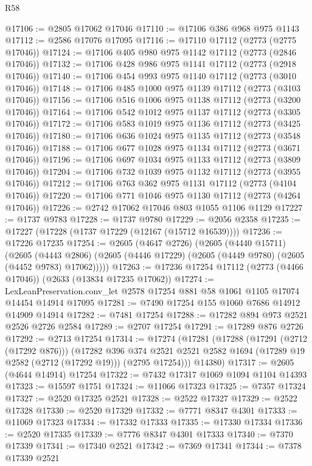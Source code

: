 \begin{lexlean}{R58}
\begin{coremodule}
@17106 := @2805 @17062 @17046
@17110 := @17106 @386 @968 @975 @1143
@17112 := @2586 @17076 @17095
@17116 := @17110 @17112 (@2773 (@2775 @17046))
@17124 := @17106 @405 @980 @975 @1142 @17112 (@2773 (@2846 @17046))
@17132 := @17106 @428 @986 @975 @1141 @17112 (@2773 (@2918 @17046))
@17140 := @17106 @454 @993 @975 @1140 @17112 (@2773 (@3010 @17046))
@17148 := @17106 @485 @1000 @975 @1139 @17112 (@2773 (@3103 @17046))
@17156 := @17106 @516 @1006 @975 @1138 @17112 (@2773 (@3200 @17046))
@17164 := @17106 @542 @1012 @975 @1137 @17112 (@2773 (@3305 @17046))
@17172 := @17106 @583 @1019 @975 @1136 @17112 (@2773 (@3425 @17046))
@17180 := @17106 @636 @1024 @975 @1135 @17112 (@2773 (@3548 @17046))
@17188 := @17106 @677 @1028 @975 @1134 @17112 (@2773 (@3671 @17046))
@17196 := @17106 @697 @1034 @975 @1133 @17112 (@2773 (@3809 @17046))
@17204 := @17106 @732 @1039 @975 @1132 @17112 (@2773 (@3955 @17046))
@17212 := @17106 @763 @362 @975 @1131 @17112 (@2773 (@4104 @17046))
@17220 := @17106 @771 @1046 @975 @1130 @17112 (@2773 (@4264 @17046))
@17226 := @2742 @17062 @17046 @803 @1055 @1106 @1129
@17227 := @1737 @9783
@17228 := @1737 @9780
@17229 := @2056 @2358
@17235 := @17227 (@17228 (@1737 @17229 (@12167 (@15712 @16539))))
@17236 := @17226 @17235
@17254 := @2605
    (@4647 @2726)
    (@2605
      (@4440 @15711)
      (@2605
        (@4443 @2806)
        (@2605 (@4446 @17229) (@2605 (@4449 @9780) (@2605 (@4452 @9783) @17062)))))
@17263 := @17236 @17254 @17112 (@2773 (@4466 @17046)) (@2633 (@13834 @17235 @17062))
@17274 := LexLeanPreservation.conv_let @2578 @17254 @881 @58 @1061 @1105 @17074 @14454 @14914 @17095
@17281 := @7490 @17254 @155 @1060 @7686 @14912 @14909 @14914
@17282 := @7481 @17254
@17288 := @17282 @894 @973 @2521 @2526 @2726 @2584
@17289 := @2707 @17254
@17291 := @17289 @876 @2726
@17292 := @2713 @17254
@17314 := @17274
    (@17281
      (@17288
        (@17291 (@2712 (@17292 @876)))
        (@17282
          @396
          @374
          @2521
          @2521
          @2582
          @1694
          (@17289 @19 @2582 (@2712 (@17292 @19)))
          (@2795 @17254)))
      @14380)
@17317 := @2605 (@4644 @14914) @17254
@17322 := @7432 @17317 @1069 @1094 @1104 @14393
@17323 := @15597 @1751
@17324 := @11066 @17323
@17325 := @7357 @17324
@17327 := @2520 @17325 @2521
@17328 := @2522 @17327
@17329 := @2522 @17328
@17330 := @2520 @17329
@17332 := @7771 @8347 @4301
@17333 := @11069 @17323
@17334 := @17332 @17333
@17335 := @17330 @17334
@17336 := @2520 @17335
@17339 := @7776 @8347 @4301 @17333
@17340 := @7370 @17339
@17341 := @17340 @2521
@17342 := @7369 @17341
@17344 := @7378 @17339 @2521

\end{coremodule}
\end{lexlean}
